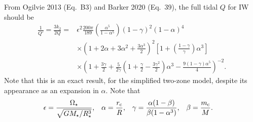 \documentclass[12pt]{article}
\newcommand*{\p}[1]{\left(#1\right)}
\newcommand*{\s}[1]{\left[#1\right]}
\begin{document}
From Ogilvie 2013 (Eq.~B3) and Barker 2020 (Eq.~39), the full tidal $Q$ for IW
should be
\begin{align}
    \frac{1}{Q'}
        = \frac{3k_2}{2Q}
        ={}&
            \epsilon^2\frac{200\pi}{189}
            \p{\frac{\alpha^5}{1 - \alpha^5}}
            \p{1 - \gamma}^2
            \p{1 - \alpha}^4\nonumber\\
        &\times
            \p{1 + 2\alpha + 3\alpha^2 + \frac{3\alpha^3}{2}}^2
            \s{1 + \p{\frac{1 - \gamma}{\gamma}}\alpha^3}\nonumber\\
        &\times
            \p{1 + \frac{3\gamma}{2}
                + \frac{5}{2\gamma}\p{1 + \frac{\gamma}{2} - \frac{3\gamma^2}{2}}
                    \alpha^3
                - \frac{9(1-\gamma)\alpha^5}{4}}^{-2}.
\end{align}
Note that this is an exact result, for the simplified two-zone model, despite
its appearance as an expansion in $\alpha$. Note that
\begin{align}
    \epsilon &= \frac{\Omega_{\star}}{\sqrt{GM_\star/R_\star^3}},&
    \alpha &= \frac{r_{\rm c}}{R},&
    \gamma &= \frac{\alpha(1 - \beta)}{\beta(1 - \alpha^3)},&
    \beta &= \frac{m_{\rm c}}{M}.
\end{align}
\end{document}
